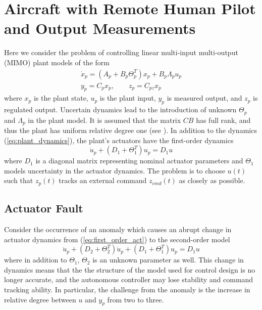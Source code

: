 \section{Aircraft with Remote Human Pilot and Output Measurements}  \label{sec:mimo_problem}
Here we consider the problem of controlling linear multi-input multi-output (MIMO) plant models of the form
\begin{equation}
\begin{gathered}
\dot x_p = (A_p + B_p \Theta_p^T) x_p + B_p \Lambda_p u_p \\
y_p = C_p x_p, \qquad z_p = C_{pz} x_p \label{eq:plant_dynamics}
\end{gathered}
\end{equation}
where $x_p$ is the plant state, $u_p$ is the plant input, $y_p$ is measured output, and $z_p$ is regulated output. Uncertain dynamics lead to the introduction of unknown $\Theta_p$ and $\Lambda_p$ in the plant model. It is assumed that the matrix $CB$ has full rank, and thus the plant has uniform relative degree one (see \cite{qu2016adaptive}). In addition to the dynamics (\ref{eq:plant_dynamics}), the plant's actuators have the first-order dynamics
\begin{equation}
	\dot{u}_p + (D_1 + \Theta_1^T) u_p = D_1 u \label{eq:first_order_act}
\end{equation}
where $D_1$ is a diagonal matrix representing nominal actuator parameters and $\Theta_1$ models uncertainty in the actuator dynamics. The problem is to choose $u(t)$ such that $z_p(t)$ tracks an external command $z_{cmd}(t)$ as closely as possible.

\subsection{Actuator Fault} \label{subsec:mimo_act_fault}
Consider the occurrence of an anomaly which causes an abrupt change in actuator dynamics from (\ref{eq:first_order_act}) to the second-order model
\begin{equation}
	\ddot{u}_p + (D_2 + \Theta_2^T) \dot{u}_p + (D_1 + \Theta_1^T) u_p = D_1 u \label{eq:second_order_act}
\end{equation}
where in addition to $\Theta_1$, $\Theta_2$ is an unknown parameter as well. This change in dynamics means that the the structure of the model used for control design is no longer accurate, and the autonomous controller may lose stability and command tracking ability. In particular, the challenge from the anomaly is the increase in relative degree between $u$ and $y_p$ from two to three.

